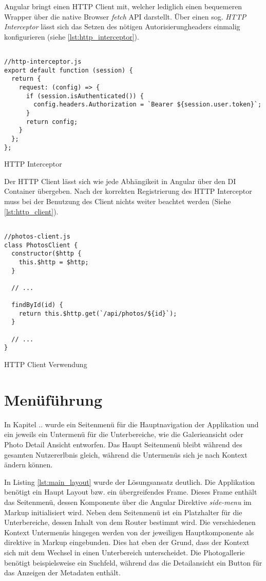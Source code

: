 Angular bringt einen HTTP Client mit, welcher lediglich einen bequemeren Wrapper über die native Browser \textit{fetch} API darstellt. Über einen sog. \textit{HTTP Interceptor} lässt sich das Setzen des nötigen Autorisierungheaders einmalig konfigurieren (siehe \ref{lst:http_interceptor}).

\begin{listing}[H]
\begin{verbatim}

//http-interceptor.js
export default function (session) {
  return {
    request: (config) => {
      if (session.isAuthenticated()) {
        config.headers.Authorization = `Bearer ${session.user.token}`;
      }
      return config;
    }
  };
};

\end{verbatim}
\caption{HTTP Interceptor}
\label{lst:http_interceptor}
\end{listing}

Der HTTP Client lässt sich wie jede Abhängikeit in Angular über den DI Container übergeben. Nach der korrekten Registrierung des HTTP Interceptor muss bei der Benutzung des Client nichts weiter beachtet werden (Siehe \ref{lst:http_client}).

\begin{listing}[H]
\begin{verbatim}

//photos-client.js
class PhotosClient {
  constructor($http {
    this.$http = $http;
  }

  // ...

  findById(id) {
    return this.$http.get(`/api/photos/${id}`);
  }

  // ...
}  

\end{verbatim}
\caption{HTTP Client Verwendung}
\label{lst:http_client}
\end{listing} 

\section{Menüführung}

In Kapitel .. wurde ein Seitenmenü für die Hauptnavigation der Applikation und ein jeweils ein Untermenü für die Unterbereiche, wie die Galerieansicht oder Photo Detail Ansicht entworfen. Das Haupt Seitenmenü bleibt während des gesamten Nutzererlbnis gleich, während die Untermenüs sich je nach Kontext ändern können.

In Listing \ref{lst:main_layout} wurde der Lösungsansatz deutlich. Die Applikation benötigt ein Haupt Layout bzw. ein übergreifendes Frame. Dieses Frame enthält das Seitenmenü, dessen Komponente über die Angular Direktive \textit{side-menu} im Markup initialisiert wird. Neben dem Seitenmenü ist ein Platzhalter für die Unterbereiche, dessen Inhalt von dem Router bestimmt wird. Die verschiedenen Kontext Untermenüs hingegen werden von der jeweiligen Hauptkomponente als direktive in Markup eingebunden. Dies hat eben der Grund, dass der Kontext sich mit dem Wechsel in einen Unterbereich unterscheidet. Die Photogallerie benötigt beispielsweise ein Suchfeld, während das die Detailansicht ein Button für das Anzeigen der Metadaten enthält.

